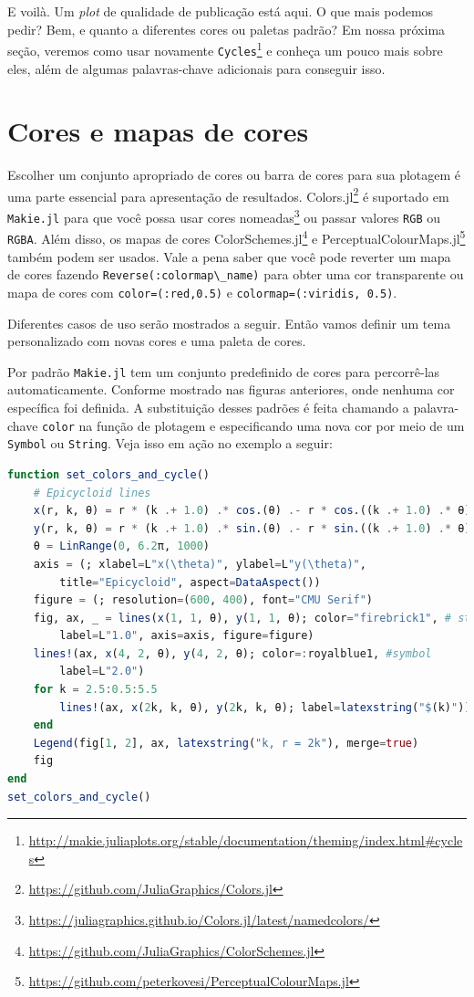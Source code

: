 \documentclass[
  notoc %
]{tufte-book}
\DeclareRobustCommand{\href}[2]{#2\footnote{\url{#1}}}
\newcommand{\passthrough}[1]{#1}
\begin{document}
E voilà. Um \emph{plot} de qualidade de publicação está aqui. O que mais
podemos pedir? Bem, e quanto a diferentes cores ou paletas padrão? Em
nossa próxima seção, veremos como usar novamente
\href{http://makie.juliaplots.org/stable/documentation/theming/index.html\#cycles}{\passthrough{\lstinline!Cycles!}}
e conheça um pouco mais sobre eles, além de algumas palavras-chave
adicionais para conseguir isso.

\hypertarget{sec:makie_colors}{%
\section{Cores e mapas de cores}\label{sec:makie_colors}}

Escolher um conjunto apropriado de cores ou barra de cores para sua
plotagem é uma parte essencial para apresentação de resultados.
\href{https://github.com/JuliaGraphics/Colors.jl}{Colors.jl} é suportado
em \passthrough{\lstinline!Makie.jl!} para que você possa usar
\href{https://juliagraphics.github.io/Colors.jl/latest/namedcolors/}{cores
nomeadas} ou passar valores \passthrough{\lstinline!RGB!} ou
\passthrough{\lstinline!RGBA!}. Além disso, os mapas de cores
\href{https://github.com/JuliaGraphics/ColorSchemes.jl}{ColorSchemes.jl}
e
\href{https://github.com/peterkovesi/PerceptualColourMaps.jl}{PerceptualColourMaps.jl}
também podem ser usados. Vale a pena saber que você pode reverter um
mapa de cores fazendo \passthrough{\lstinline!Reverse(:colormap\_name)!}
para obter uma cor transparente ou mapa de cores com
\passthrough{\lstinline!color=(:red,0.5)!} e
\passthrough{\lstinline!colormap=(:viridis, 0.5)!}.

Diferentes casos de uso serão mostrados a seguir. Então vamos definir um
tema personalizado com novas cores e uma paleta de cores.

Por padrão \passthrough{\lstinline!Makie.jl!} tem um conjunto
predefinido de cores para percorrê-las automaticamente. Conforme
mostrado nas figuras anteriores, onde nenhuma cor específica foi
definida. A substituição desses padrões é feita chamando a palavra-chave
\passthrough{\lstinline!color!} na função de plotagem e especificando
uma nova cor por meio de um \passthrough{\lstinline!Symbol!} ou
\passthrough{\lstinline!String!}. Veja isso em ação no exemplo a seguir:

\begin{lstlisting}[language=Julia]
function set_colors_and_cycle()
    # Epicycloid lines
    x(r, k, θ) = r * (k .+ 1.0) .* cos.(θ) .- r * cos.((k .+ 1.0) .* θ)
    y(r, k, θ) = r * (k .+ 1.0) .* sin.(θ) .- r * sin.((k .+ 1.0) .* θ)
    θ = LinRange(0, 6.2π, 1000)
    axis = (; xlabel=L"x(\theta)", ylabel=L"y(\theta)",
        title="Epicycloid", aspect=DataAspect())
    figure = (; resolution=(600, 400), font="CMU Serif")
    fig, ax, _ = lines(x(1, 1, θ), y(1, 1, θ); color="firebrick1", # string
        label=L"1.0", axis=axis, figure=figure)
    lines!(ax, x(4, 2, θ), y(4, 2, θ); color=:royalblue1, #symbol
        label=L"2.0")
    for k = 2.5:0.5:5.5
        lines!(ax, x(2k, k, θ), y(2k, k, θ); label=latexstring("$(k)")) #cycle
    end
    Legend(fig[1, 2], ax, latexstring("k, r = 2k"), merge=true)
    fig
end
set_colors_and_cycle()
\end{lstlisting}
\end{document}
